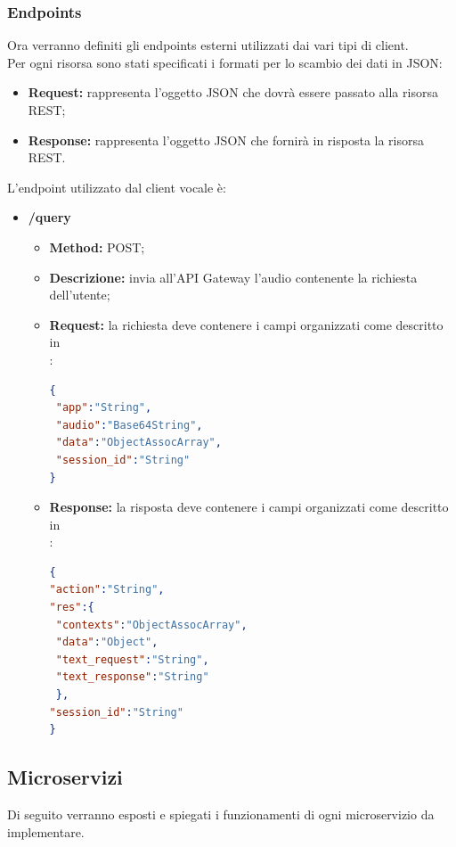 \subsubsection{Endpoints}
	Ora verranno definiti gli endpoints esterni utilizzati dai vari tipi di client.\\
	Per ogni risorsa sono stati specificati i formati per lo scambio dei dati in JSON:
	\begin{itemize}
		\item \textbf{Request:} rappresenta l’oggetto JSON che dovrà essere passato alla risorsa REST;
		\item \textbf{Response:} rappresenta l’oggetto JSON che fornirà in risposta la risorsa REST.
	\end{itemize}
	L'endpoint utilizzato dal client vocale è:
	\begin{itemize}
		\item \textbf{/query}\\
		\begin{itemize}
			\item \textbf{Method:} POST;
			\item \textbf{Descrizione:} invia all'API Gateway l'audio contenente la richiesta dell'utente;
			\item \textbf{Request:} la richiesta deve contenere i campi organizzati come descritto in \\:
\begin{lstlisting}[language=json,firstnumber=1]
{
 "app":"String",
 "audio":"Base64String",
 "data":"ObjectAssocArray",
 "session_id":"String"
}
\end{lstlisting}
			\item \textbf{Response:} la risposta deve contenere i campi organizzati come descritto in \\:
\begin{lstlisting}[language=json,firstnumber=1]
{
"action":"String",
"res":{
 "contexts":"ObjectAssocArray",
 "data":"Object",
 "text_request":"String",
 "text_response":"String"
 },
"session_id":"String"
}
\end{lstlisting}
		\end{itemize}
	\end{itemize}

\subsection{Microservizi}
Di seguito verranno esposti e spiegati i funzionamenti di ogni microservizio da implementare.
